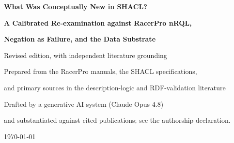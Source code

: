 \documentclass[11pt,letterpaper]{article}
\theoremstyle{definition}
\newcommand{\nrql}{nRQL}
\newcommand{\shacl}{SHACL}
\newcommand{\rdf}{RDF}
\begin{document}
\begin{titlepage}
  \centering
  \vspace*{1.1in}
  {\LARGE \bfseries What Was Conceptually New in SHACL?\par}
  \vspace{0.25in}
  {\Large \bfseries A Calibrated Re-examination against RacerPro \nrql{},\par}
  {\Large \bfseries Negation as Failure, and the Data Substrate\par}
  \vspace{0.5in}
  {\large Revised edition, with independent literature grounding\par}
  \vspace{0.9in}
  {\large Prepared from the RacerPro manuals, the \shacl{} specifications,\par}
  {\large and primary sources in the description-logic and \rdf{}-validation literature\par}
  \vspace{0.45in}
  {\large Drafted by a generative AI system (Claude Opus 4.8)\par}
  {\normalsize and substantiated against cited publications; see the authorship declaration.\par}
  \vfill
  {\large \today\par}
\end{titlepage}
\end{document}
